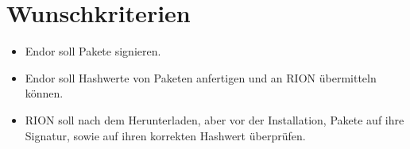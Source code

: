 \section{Wunschkriterien}
\begin{itemize}
	\item Endor soll Pakete signieren.
	\item Endor soll Hashwerte von Paketen anfertigen und an RION übermitteln können.
	\item RION soll nach dem Herunterladen, aber vor der Installation, Pakete auf ihre Signatur, sowie auf ihren korrekten Hashwert überprüfen.

\end{itemize}
